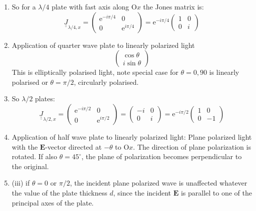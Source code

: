 \documentclass[12pt,a4paper]{article}
\begin{document}
\begin{enumerate}
$$\begin{array}{c}
    \end{array}\right\}
    $$
    \item So for a $\lambda / 4$ plate with fast axis along $\mathrm{O} x$ the Jones matrix is:
    $$
    \underline{\underline{J}}_{\lambda / 4, x}=\left(\begin{array}{cc}
    \mathrm{e}^{-i \pi / 4} & 0 \\
    0 & \mathrm{e}^{i \pi / 4}
    \end{array}\right)=\mathrm{e}^{-i \pi / 4}\left(\begin{array}{ll}
    1 & 0 \\
    0 & i
    \end{array}\right)
    $$
    \item Application of quarter wave plate to linearly polarized light
    $$
    \left(\begin{array}{c}
    \cos \theta \\
    i \sin \theta
    \end{array}\right)
    $$
    This is elliptically polarised light, note special case for $\theta=0,90$ is linearly polarised or $\theta=\pi / 2$, circularly polarised.
    \item So $\lambda / 2$ plates:
    $$
    \underline{\underline{J}}_{\lambda / 2, x}=\left(\begin{array}{cc}
    \mathrm{e}^{-i \pi / 2} & 0 \\
    0 & \mathrm{e}^{i \pi / 2}
    \end{array}\right)=\left(\begin{array}{cc}
    -i & 0 \\
    0 & i
    \end{array}\right)=\mathrm{e}^{-i \pi / 2}\left(\begin{array}{cc}
    1 & 0 \\
    0 & -1
    \end{array}\right)
    $$
    \item Application of half wave plate to linearly polarized light:
    Plane polarized light with the $\boldsymbol{E}$-vector directed at $-\theta$ to $\mathrm{O} x$. The direction of plane polarization is rotated.
    If also $\theta=45^{\circ}$, the plane of polarization becomes perpendicular to the original.
    \item 
    (iii) if $\theta=0$ or $\pi / 2$, the incident plane polarized wave is unaffected whatever the value of the plate thickness $d$, since the incident $\boldsymbol{E}$ is parallel to one of the principal axes of the plate. 
\end{enumerate}
\end{document}
